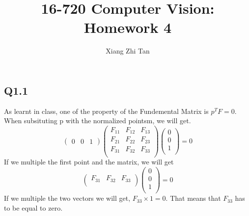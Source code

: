 \documentclass{article}
\begin{document}
\title{16-720 Computer Vision: Homework 4}
\author{Xiang Zhi Tan}

\maketitle
\subsection*{Q1.1}
As learnt in class, one of the property of the Fundemental Matrix is $p^TF = 0$. When subsituting p with the normalized pointsm, we will get.
\begin{equation*}
\begin{pmatrix}
0 & 0 & 1
\end{pmatrix}
\begin{pmatrix}
F_{11}&F_{12}&F_{13}\\
F_{21}&F_{22}&F_{23}\\
F_{31}&F_{32}&F_{33}\\
\end{pmatrix}
\begin{pmatrix}
0\\
0\\
1\\
\end{pmatrix}
= 0
\end{equation*}
If we multiple the first point and the matrix, we will get
\begin{equation*}
\begin{pmatrix}
F_{31}&F_{32}&F_{33}\\
\end{pmatrix}
\begin{pmatrix}
0\\
0\\
1\\
\end{pmatrix}
= 0
\end{equation*}
If we multiple the two vectors we will get, $F_{33} \times 1 = 0$. That means that $F_{33}$ has to be equal to zero.
\end{document}
